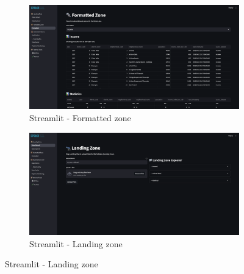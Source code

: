 \begin{figure}[H]
    \begin{subfigure}[b]{0.45\textwidth}
        \includegraphics[width=\linewidth]{latex/imgs/app/formatted_zone.png}
        \caption{Streamlit - Formatted zone}
        \label{fig:formatted-zone}
    \end{subfigure}
    \hfill
    \begin{subfigure}[b]{0.45\textwidth}
        \includegraphics[width=\linewidth]{latex/imgs/app/landing_zone.png}
        \caption{Streamlit - Landing zone}
        \label{fig:landing-zone}
    \end{subfigure}


\end{figure}

